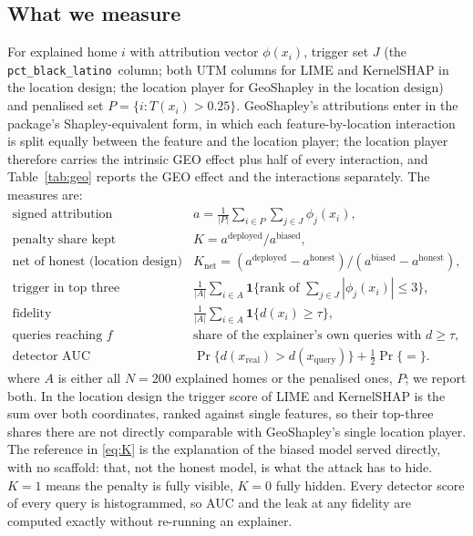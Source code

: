 \documentclass[11pt]{article}
\newcommand{\pct}{\texttt{pct\_black\_latino}}
\newcommand{\1}{\mathbf{1}}
\begin{document}
\subsection{What we measure}
For explained home $i$ with attribution vector $\phi(x_i)$, trigger set $J$ (the \pct\ column; both UTM columns for
LIME and KernelSHAP in the location design; the location player for GeoShapley in the location design) and penalised
set $P = \{i : T(x_i) > 0.25\}$. GeoShapley's attributions enter in the package's Shapley-equivalent form, in which
each feature-by-location interaction is split equally between the feature and the location player; the
location player therefore carries the intrinsic GEO effect plus half of every interaction, and
Table~\ref{tab:geo} reports the GEO effect and the interactions separately. The measures are:
\begin{align}
  \text{signed attribution} \quad & a = \frac{1}{|P|}\sum_{i \in P}\sum_{j \in J}\phi_j(x_i), \\
  \text{penalty share kept} \quad & K = a^{\text{deployed}} / a^{\text{biased}}, \label{eq:K}\\
  \text{net of honest (location design)} \quad & K_{\text{net}} = (a^{\text{deployed}} - a^{\text{honest}}) / (a^{\text{biased}} - a^{\text{honest}}),\\
  \text{trigger in top three} \quad & \tfrac{1}{|A|}\textstyle\sum_{i\in A} \1\{\text{rank of } \textstyle\sum_{j\in J}|\phi_j(x_i)| \le 3\},\\
  \text{fidelity} \quad & \tfrac{1}{|A|}\textstyle\sum_{i\in A} \1\{d(x_i) \ge \tau\},\\
  \text{queries reaching } f \quad & \text{share of the explainer's own queries with } d \ge \tau,\\
  \text{detector AUC} \quad & \Pr\{d(x_{\text{real}}) > d(x_{\text{query}})\} + \tfrac12\Pr\{=\}.
\end{align}
where $A$ is either all $N = 200$ explained homes or the penalised ones, $P$; we report both. In the location design
the trigger score of LIME and KernelSHAP is the sum over both coordinates, ranked against single features, so their
top-three shares there are not directly comparable with GeoShapley's single location player. The reference in
\eqref{eq:K} is the explanation of the biased model served directly, with no scaffold: that, not the honest model, is
what the attack has to hide. $K = 1$ means the penalty is fully visible, $K = 0$ fully hidden.
Every detector score of every query is histogrammed, so AUC and the leak at any fidelity are computed exactly
without re-running an explainer.
\end{document}
